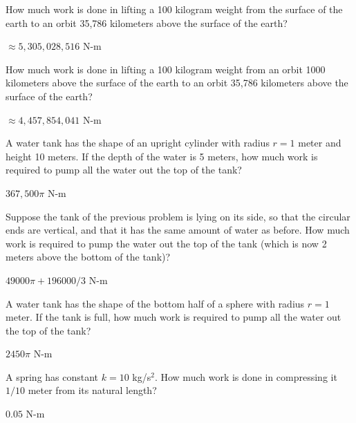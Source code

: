 \begin{exercises}

\begin{exercise} How much work is done in lifting a 100 kilogram weight from
the surface of the earth to an orbit 35,786 kilometers above the
surface of the earth?
\begin{answer} $\approx 5,305,028,516$ N-m
\end{answer}\end{exercise}

\begin{exercise} How much work is done in lifting a 100 kilogram weight from
an orbit 1000 kilometers above the surface of the earth to an orbit
35,786 kilometers above the surface of the earth?
\begin{answer} $\approx 4,457,854,041$ N-m
\end{answer}\end{exercise}

\begin{exercise} A water tank has the shape of an upright cylinder with radius $r=1$
meter and height 10 meters. If the depth of the water is 5 meters, how
much work is required to pump all the water out the top of the tank?
\begin{answer} $367,500 \pi$ N-m
\end{answer}\end{exercise}

\begin{exercise} Suppose the tank of the previous problem is lying on its
side, so that the circular ends are vertical, and that it has the same
amount of water as before. How much work is required to pump the water
out the top of the tank (which is now 2 meters above the bottom of the
tank)?
\begin{answer} $49000\pi + 196000/3$ N-m
\end{answer}\end{exercise}

\begin{exercise} A water tank has the shape of the bottom half of a sphere
with radius $r=1$ meter. If the tank is full,
how much work is required to pump all the water out
the top of the tank?
\begin{answer} $2450\pi$ N-m
\end{answer}\end{exercise}

\begin{exercise} A spring has constant $k=10$ kg/s$^2$. How much work is done
in compressing it $1/10$ meter from its natural length?
\begin{answer} $0.05$ N-m
\end{answer}\end{exercise}


\end{exercises}

